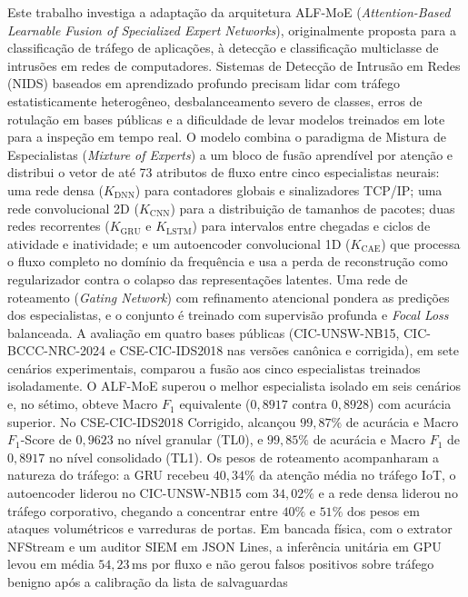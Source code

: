 \documentclass[
	12pt,		%
	a4paper,	%
	openright,  %
	oneside,	%
	chapter=TITLE,		%
	section=TITLE,		%
	english,	%
	brazilian   %
]{abntex2}
\begin{document}
%
\begin{resumo}
	Este trabalho investiga a adaptação da arquitetura ALF-MoE (\textit{Attention-Based Learnable Fusion of Specialized Expert Networks}), originalmente proposta para a classificação de tráfego de aplicações, à detecção e classificação multiclasse de intrusões em redes de computadores. Sistemas de Detecção de Intrusão em Redes (NIDS) baseados em aprendizado profundo precisam lidar com tráfego estatisticamente heterogêneo, desbalanceamento severo de classes, erros de rotulação em bases públicas e a dificuldade de levar modelos treinados em lote para a inspeção em tempo real. O modelo combina o paradigma de Mistura de Especialistas (\textit{Mixture of Experts}) a um bloco de fusão aprendível por atenção e distribui o vetor de até 73 atributos de fluxo entre cinco especialistas neurais: uma rede densa ($K_{\mathrm{DNN}}$) para contadores globais e sinalizadores TCP/IP; uma rede convolucional 2D ($K_{\mathrm{CNN}}$) para a distribuição de tamanhos de pacotes; duas redes recorrentes ($K_{\mathrm{GRU}}$ e $K_{\mathrm{LSTM}}$) para intervalos entre chegadas e ciclos de atividade e inatividade; e um autoencoder convolucional 1D ($K_{\mathrm{CAE}}$) que processa o fluxo completo no domínio da frequência e usa a perda de reconstrução como regularizador contra o colapso das representações latentes. Uma rede de roteamento (\textit{Gating Network}) com refinamento atencional pondera as predições dos especialistas, e o conjunto é treinado com supervisão profunda e \textit{Focal Loss} balanceada. A avaliação em quatro bases públicas (CIC-UNSW-NB15, CIC-BCCC-NRC-2024 e CSE-CIC-IDS2018 nas versões canônica e corrigida), em sete cenários experimentais, comparou a fusão aos cinco especialistas treinados isoladamente. O ALF-MoE superou o melhor especialista isolado em seis cenários e, no sétimo, obteve Macro $F_1$ equivalente ($0{,}8917$ contra $0{,}8928$) com acurácia superior. No CSE-CIC-IDS2018 Corrigido, alcançou $99{,}87\%$ de acurácia e Macro $F_1$-Score de $0{,}9623$ no nível granular (TL0), e $99{,}85\%$ de acurácia e Macro $F_1$ de $0{,}8917$ no nível consolidado (TL1). Os pesos de roteamento acompanharam a natureza do tráfego: a GRU recebeu $40{,}34\%$ da atenção média no tráfego IoT, o autoencoder liderou no CIC-UNSW-NB15 com $34{,}02\%$ e a rede densa liderou no tráfego corporativo, chegando a concentrar entre $40\%$ e $51\%$ dos pesos em ataques volumétricos e varreduras de portas. Em bancada física, com o extrator NFStream e um auditor SIEM em JSON Lines, a inferência unitária em GPU levou em média $54{,}23\,\mathrm{ms}$ por fluxo e não gerou falsos positivos sobre tráfego benigno após a calibração da lista de salvaguardas 
\end{resumo}
\end{document}
